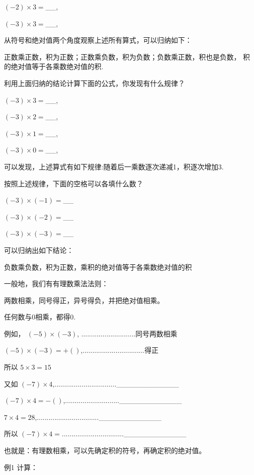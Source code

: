 \documentclass{article}
\begin{document}
\begin{article}
$(-2)\times3=$__,

$(-3)\times3=$__,

从符号和绝对值两个角度观察上述所有算式，可以归纳如下：

正数乘正数，积为正数；正数乘负数，积为负数；负数乘正数，积也是负数，
积的绝对值等于各乘数绝对值的积.

\begin{example}

利用上面归纳的结论计算下面的公式，你发现有什么规律？

$(-3)\times3=$__,

$(-3)\times2=$__,

$(-3)\times1=$__,

$(-3)\times0=$__,

\end{example}

可以发现，上述算式有如下规律:随着后一乘数逐次递减1，积逐次增加3.

按照上述规律，下面的空格可以各填什么数？

$(-3)\times(-1)=$__

$(-3)\times(-2)=$__

$(-3)\times(-3)=$__

可以归纳出如下结论：

负数乘负数，积为正数，乘积的绝对值等于各乘数绝对值的积

一般地，我们有有理数乘法法则：

两数相乘，同号得正，异号得负，并把绝对值相乘。

任何数与0相乘，都得0.

例如，  $(-5)\times(-3)$, ............................同号两数相乘

        $(-5)\times(-3)=+( )$,................................得正
        
所以    $5\times3=15$

又如    $(-7)\times4$,................................____________

        $(-7)\times4=-()$,............................____________
        
        $7\times4=28$,................................____________
        
所以    $(-7)\times4=$................................____________        

也就是：有理数相乘，可以先确定积的符号，再确定积的绝对值。

\begin{example}

例1 计算：


\end{example}
\end{article}
\end{document}
